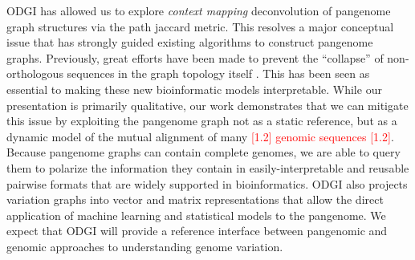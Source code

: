 \documentclass{bioinfo}
\newcommand{\REVIEWED}[1]{{\textcolor{Red}{#1}}}
\begin{document}
ODGI has allowed us to explore \textit{context mapping} deconvolution of pangenome graph structures via the path jaccard metric.
This resolves a major conceptual issue that has strongly guided existing algorithms to construct pangenome graphs.
Previously, great efforts have been made to prevent the ``collapse'' of non-orthologous sequences in the graph topology itself  \citep{Li:2020}.
This has been seen as essential to making these new bioinformatic models interpretable.
While our presentation is primarily qualitative, our work demonstrates that we can mitigate this issue by exploiting the pangenome graph not as a static reference, but as a dynamic model of the mutual alignment of many \REVIEWED{[1.2] genomic sequences [1.2]}.
Because pangenome graphs can contain complete genomes, we are able to query them to polarize the information they contain in easily-interpretable and reusable pairwise formats that are widely supported in bioinformatics.
ODGI also projects variation graphs into vector and matrix representations that allow the direct application of machine learning and statistical models to the pangenome.
We expect that ODGI will provide a reference interface between pangenomic and genomic approaches to understanding genome variation.




\end{document}
